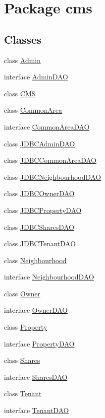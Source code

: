 \hypertarget{namespacecms}{}\section{Package cms}
\label{namespacecms}
\subsection*{Classes}
\begin{DoxyCompactItemize}
\item 
class \mbox{\hyperlink{classcms_1_1_admin}{Admin}}
\item 
interface \mbox{\hyperlink{interfacecms_1_1_admin_d_a_o}{Admin\+D\+AO}}
\item 
class \mbox{\hyperlink{classcms_1_1_c_m_s}{C\+MS}}
\item 
class \mbox{\hyperlink{classcms_1_1_common_area}{Common\+Area}}
\item 
interface \mbox{\hyperlink{interfacecms_1_1_common_area_d_a_o}{Common\+Area\+D\+AO}}
\item 
class \mbox{\hyperlink{classcms_1_1_j_d_b_c_admin_d_a_o}{J\+D\+B\+C\+Admin\+D\+AO}}
\item 
class \mbox{\hyperlink{classcms_1_1_j_d_b_c_common_area_d_a_o}{J\+D\+B\+C\+Common\+Area\+D\+AO}}
\item 
class \mbox{\hyperlink{classcms_1_1_j_d_b_c_neighbourhood_d_a_o}{J\+D\+B\+C\+Neighbourhood\+D\+AO}}
\item 
class \mbox{\hyperlink{classcms_1_1_j_d_b_c_owner_d_a_o}{J\+D\+B\+C\+Owner\+D\+AO}}
\item 
class \mbox{\hyperlink{classcms_1_1_j_d_b_c_property_d_a_o}{J\+D\+B\+C\+Property\+D\+AO}}
\item 
class \mbox{\hyperlink{classcms_1_1_j_d_b_c_shares_d_a_o}{J\+D\+B\+C\+Shares\+D\+AO}}
\item 
class \mbox{\hyperlink{classcms_1_1_j_d_b_c_tenant_d_a_o}{J\+D\+B\+C\+Tenant\+D\+AO}}
\item 
class \mbox{\hyperlink{classcms_1_1_neighbourhood}{Neighbourhood}}
\item 
interface \mbox{\hyperlink{interfacecms_1_1_neighbourhood_d_a_o}{Neighbourhood\+D\+AO}}
\item 
class \mbox{\hyperlink{classcms_1_1_owner}{Owner}}
\item 
interface \mbox{\hyperlink{interfacecms_1_1_owner_d_a_o}{Owner\+D\+AO}}
\item 
class \mbox{\hyperlink{classcms_1_1_property}{Property}}
\item 
interface \mbox{\hyperlink{interfacecms_1_1_property_d_a_o}{Property\+D\+AO}}
\item 
class \mbox{\hyperlink{classcms_1_1_shares}{Shares}}
\item 
interface \mbox{\hyperlink{interfacecms_1_1_shares_d_a_o}{Shares\+D\+AO}}
\item 
class \mbox{\hyperlink{classcms_1_1_tenant}{Tenant}}
\item 
interface \mbox{\hyperlink{interfacecms_1_1_tenant_d_a_o}{Tenant\+D\+AO}}
\end{DoxyCompactItemize}
